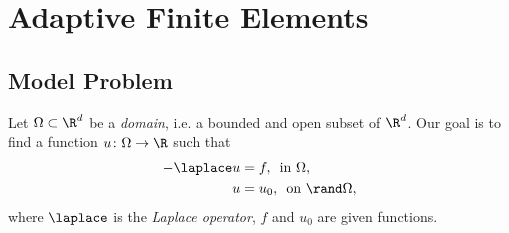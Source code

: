 
\chapter{Adaptive Finite Elements}
\section{Model Problem}
Let $\Omega\subset\R^d$ be a \textit{domain}, i.e. a bounded and open subset of $\R^d$. Our goal is to find a function $u\colon\Omega\to\R$ such that
\begin{align*}
    -\laplace u & = f,\,\text{ in } \Omega, \\
    u & =u_0,\,\text{ on } \rand\Omega,
\end{align*}
where $\laplace$ is the \textit{Laplace operator}, $f$ and $u_0$ are given functions.
